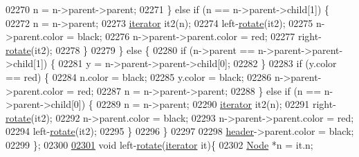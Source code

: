 \begin{DoxyCode}
02270                         n = n->parent->parent;
02271                     \} \textcolor{keywordflow}{else} \textcolor{keywordflow}{if} (n == n->parent->child[1]) \{
02272                         n = n->parent;
02273                         \hyperlink{classaed2_1_1iterator_1_1iterator}{iterator} it2(n);
02274                         left-\hyperlink{classaed2_1_1iterator_af4e447a081108196ecdf39b16ecb5303_af4e447a081108196ecdf39b16ecb5303}{rotate}(it2);
02275                         n->parent.color = black;
02276                         n->parent->parent.color = red;
02277                         right-\hyperlink{classaed2_1_1iterator_af4e447a081108196ecdf39b16ecb5303_af4e447a081108196ecdf39b16ecb5303}{rotate}(it2);
02278                     \}
02279                 \} \textcolor{keywordflow}{else} \{
02280                     \textcolor{keywordflow}{if} (n->parent == n->parent->parent->child[1]) \{
02281                         y = n->parent->parent->child[0];
02282                     \}
02283                     \textcolor{keywordflow}{if} (y.color == red) \{
02284                         n.color = black;
02285                         y.color = black;
02286                         n->parent->parent.color = red;
02287                         n = n->parent->parent;
02288                     \} \textcolor{keywordflow}{else} \textcolor{keywordflow}{if} (n == n->parent->child[0]) \{
02289                         n = n->parent;
02290                         \hyperlink{classaed2_1_1iterator_1_1iterator}{iterator} it2(n);
02291                         right-\hyperlink{classaed2_1_1iterator_af4e447a081108196ecdf39b16ecb5303_af4e447a081108196ecdf39b16ecb5303}{rotate}(it2);
02292                         n->parent.color = black;
02293                         n->parent->parent.color = red;
02294                         left-\hyperlink{classaed2_1_1iterator_af4e447a081108196ecdf39b16ecb5303_af4e447a081108196ecdf39b16ecb5303}{rotate}(it2);
02295                     \}
02296                 \}
02297 
02298                 \hyperlink{classaed2_1_1iterator_a19db18e2e77583eb1fa819e854ff9c71_a19db18e2e77583eb1fa819e854ff9c71}{header}->parent.color = black;
02299             \};
02300 
\hypertarget{map2_8h_source_l02301}{}\hyperlink{classaed2_1_1iterator_af4e447a081108196ecdf39b16ecb5303_af4e447a081108196ecdf39b16ecb5303}{02301}             \textcolor{keywordtype}{void} left-\hyperlink{classaed2_1_1iterator_af4e447a081108196ecdf39b16ecb5303_af4e447a081108196ecdf39b16ecb5303}{rotate}(\hyperlink{classaed2_1_1iterator_1_1iterator}{iterator} it)\{
02302                 \hyperlink{structaed2_1_1iterator_1_1Node}{Node} *n = it.n;

\end{DoxyCode}
